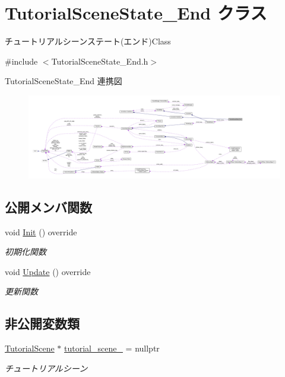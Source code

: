\hypertarget{class_tutorial_scene_state___end}{}\section{Tutorial\+Scene\+State\+\_\+\+End クラス}
\label{class_tutorial_scene_state___end}


チュートリアルシーンステート(エンド)Class  




{\ttfamily \#include $<$Tutorial\+Scene\+State\+\_\+\+End.\+h$>$}



Tutorial\+Scene\+State\+\_\+\+End 連携図\nopagebreak
\begin{figure}[H]
\begin{center}
\leavevmode
\includegraphics[width=350pt]{class_tutorial_scene_state___end__coll__graph}
\end{center}
\end{figure}
\subsection*{公開メンバ関数}
\begin{DoxyCompactItemize}
\item 
void \mbox{\hyperlink{class_tutorial_scene_state___end_a572e5687140ff5ac43789f90462c05a5}{Init}} () override
\begin{DoxyCompactList}\small\item\em 初期化関数 \end{DoxyCompactList}\item 
void \mbox{\hyperlink{class_tutorial_scene_state___end_a7cdf03fa9a0e41ab86c2b41b8165ad09}{Update}} () override
\begin{DoxyCompactList}\small\item\em 更新関数 \end{DoxyCompactList}\end{DoxyCompactItemize}
\subsection*{非公開変数類}
\begin{DoxyCompactItemize}
\item 
\mbox{\hyperlink{class_tutorial_scene}{Tutorial\+Scene}} $\ast$ \mbox{\hyperlink{class_tutorial_scene_state___end_a68f36e80b530182a5b5d835425b7e829}{tutorial\+\_\+scene\+\_\+}} = nullptr
\begin{DoxyCompactList}\small\item\em チュートリアルシーン \end{DoxyCompactList}\end{DoxyCompactItemize}



